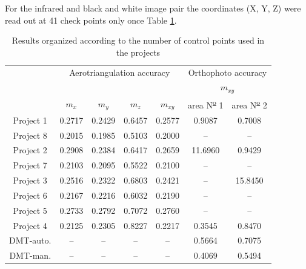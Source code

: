 \documentclass[12pt]{spieman}
\begin{document}
For the infrared and black and white image pair the coordinates (X, Y, Z) were read out at 41 check points only once Table \ref{tab:table}. 
\begin{table}[H]
\caption{Results organized according to the number of control points used in the projects}
\centering
\begin{tabular}{|c|c|c|c|c|c|c|}
\hline
&\multicolumn{4}{c|}{Aerotriangulation accuracy} &\multicolumn{2}{c|}{Orthophoto accuracy} \\  
&\multicolumn{4}{c|}{} & \multicolumn{2}{c|}{$m_{xy}$} \\ 
\cline{2-7}
& $m_{x}$ & $m_{y}$ & $m_{z}$ & $m_{xy}$ & area N\textsuperscript{\underline{o}} 1 & area N\textsuperscript{\underline{o}} 2 \\
\hline
Project 1 & 0.2717 & 0.2429 & 0.6457 & 0.2577 & 0.9087 & 0.7008\\
\hline
Project 8 & 0.2015 & 0.1985 & 0.5103  & 0.2000 & – & – \\
\hline
Project 2 & 0.2908 & 0.2384 & 0.6417 & 0.2659 & 11.6960 & 0.9429 \\
\hline
Project 7 & 0.2103 & 0.2095 & 0.5522 & 0.2100 & – & –\\
\hline
Project 3 & 0.2516 & 0.2322 & 0.6803 & 0.2421 & – & 15.8450\\
\hline
Project 6 & 0.2167 & 0.2216 & 0.6032 & 0.2190 & – & –\\
\hline
Project 5 & 0.2733 & 0.2792 & 0.7072 & 0.2760 & – & – \\
\hline
Project 4 & 0.2125 & 0.2305 & 0.8227 & 0.2217 & 0.3545 & 0.8470 \\
\hline
DMT-auto. & – & – & – & – & 0.5664 & 0.7075 \\
\hline
DMT-man. & – & – & – & – & 0.4069 & 0.5494 \\
\hline
\end{tabular}
\label{tab:table}
\end{table}
\end{document}
